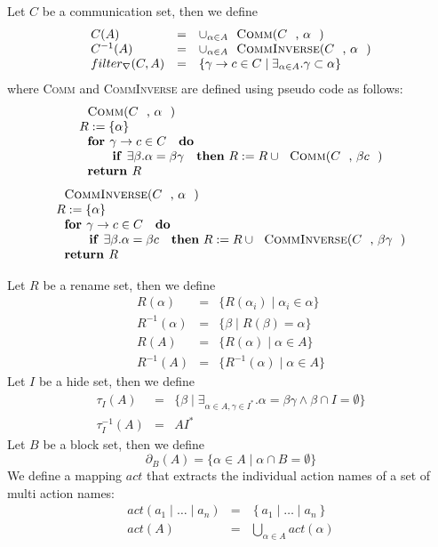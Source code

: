 \documentclass{article}
\begin{document}
Let $C$ be a communication set, then we define%
\[
\begin{array}{lll}
C(A) & = & \cup _{\alpha \in A}\text{\textsc{Comm}(}C\text{, }\alpha \text{)}
\\ 
C^{-1}(A) & = & \cup _{\alpha \in A}\text{\textsc{CommInverse}(}C\text{, }%
\alpha \text{)} \\ 
filter_{\nabla }(C,A) & = & \{\gamma \rightarrow c\in C\mid \exists _{\alpha
\in A}.\gamma \subset \alpha \}%
\end{array}%
\]%
where \textsc{Comm} and \textsc{CommInverse} are defined using pseudo code
as follows:%
\[
\begin{array}{l}
\text{\textsc{Comm}(}C\text{, }\alpha \text{)} \\ 
R:=\{\alpha \} \\ 
\text{\textbf{for }}\gamma \rightarrow c\in C\text{ \textbf{do}} \\ 
\qquad \text{\textbf{if }}\exists \beta .\alpha =\beta \gamma \text{ \textbf{%
then} }R:=R\cup \text{\textsc{Comm}(}C\text{, }\beta c\text{)} \\ 
\text{\textbf{return }}R%
\end{array}%
\]%
\[
\begin{array}{l}
\text{\textsc{CommInverse}(}C\text{, }\alpha \text{)} \\ 
R:=\{\alpha \} \\ 
\text{\textbf{for }}\gamma \rightarrow c\in C\text{ \textbf{do}} \\ 
\qquad \text{\textbf{if }}\exists \beta .\alpha =\beta c\text{ \textbf{then} 
}R:=R\cup \text{\textsc{CommInverse}(}C\text{, }\beta \gamma \text{)} \\ 
\text{\textbf{return }}R%
\end{array}%
\]

Let $R$ be a rename set, then we define%
\[
\begin{array}{lll}
R(\alpha ) & = & \{R(\alpha _{i})\mid \alpha _{i}\in \alpha \} \\ 
R^{-1}(\alpha ) & = & \{\beta \mid R(\beta )=\alpha \} \\ 
R(A) & = & \{R(\alpha )\mid \alpha \in A\} \\ 
R^{-1}(A) & = & \{R^{-1}(\alpha )\mid \alpha \in A\}%
\end{array}%
\]%
Let $I$ be a hide set, then we define%
\[
\begin{array}{ccc}
\tau _{I}(A) & = & \{\beta \mid \exists _{\alpha \in A,\gamma \in I^{\ast
}}.\alpha =\beta \gamma \wedge \beta \cap I=\emptyset \} \\ 
\tau _{I}^{-1}(A) & = & AI^{\ast }%
\end{array}%
\]%
Let $B$ be a block set, then we define%
\[
\partial _{B}(A)=\{\alpha \in A\mid \alpha \cap B=\emptyset \} 
\]%
We define a mapping $act$ that extracts the individual action names of a set
of multi action names:%
\[
\begin{array}{lll}
act\left( a_{1}\mid \ldots \mid a_{n}\right) & = & \left\{ a_{1}\mid \ldots
\mid a_{n}\right\} \\ 
act\left( A\right) & = & \bigcup_{\alpha \in A}act\left( \alpha \right)%
\end{array}%
\]
\end{document}
